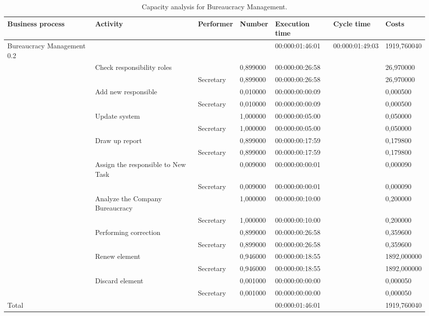\begin{landscape}
\centering
\begin{table}
{\tiny
\begin{tabular}{|l|l|l|l|l|l|l|}
Business process&Activity&Performer&Number&Execution time&Cycle time&Costs\\
\hline
Bureaucracy Management 0.2&&&&00:000:01:46:01&00:000:01:49:03&1919,760040\\
\hline
&Check responsibility roles&&0,899000&00:000:00:26:58&&26,970000\\
\hline
&&Secretary&0,899000&00:000:00:26:58&&26,970000\\
\hline
&Add new responsible&&0,010000&00:000:00:00:09&&0,000500\\
\hline
&&Secretary&0,010000&00:000:00:00:09&&0,000500\\
\hline
&Update system&&1,000000&00:000:00:05:00&&0,050000\\
\hline
&&Secretary&1,000000&00:000:00:05:00&&0,050000\\
\hline
&Draw up report&&0,899000&00:000:00:17:59&&0,179800\\
\hline
&&Secretary&0,899000&00:000:00:17:59&&0,179800\\
\hline
&Assign the responsible to New Task&&0,009000&00:000:00:00:01&&0,000090\\
\hline
&&Secretary&0,009000&00:000:00:00:01&&0,000090\\
\hline
&Analyze the Company Bureaucracy&&1,000000&00:000:00:10:00&&0,200000\\
\hline
&&Secretary&1,000000&00:000:00:10:00&&0,200000\\
\hline
&Performing correction&&0,899000&00:000:00:26:58&&0,359600\\
\hline
&&Secretary&0,899000&00:000:00:26:58&&0,359600\\
\hline
&Renew element&&0,946000&00:000:00:18:55&&1892,000000\\
\hline
&&Secretary&0,946000&00:000:00:18:55&&1892,000000\\
\hline
&Discard element&&0,001000&00:000:00:00:00&&0,000050\\
\hline
&&Secretary&0,001000&00:000:00:00:00&&0,000050\\
\hline
Total&&&&00:000:01:46:01&&1919,760040
\end{tabular}
}
\caption{Capacity analysis for Bureaucracy Management.}
\end{table}
\end{landscape}
%

%

